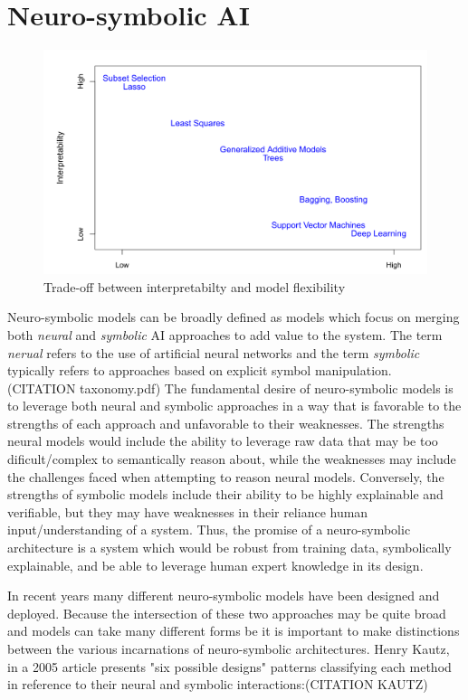 \section{Neuro-symbolic AI} \label{se:neurosymbolic_ai}

\begin{figure}[htb]
	\centering
	\includegraphics[scale=0.25]{./images/interpretability_vs_flexibility.png}
	\caption{Trade-off between interpretabilty and model flexibility \cite{james2013introduction}} 
\end{figure}

Neuro-symbolic models can be broadly defined as models which focus on merging both \textit{neural} and \textit{symbolic} AI approaches to add value to the system. The term \textit{nerual} refers to the use of artificial neural networks and the term \textit{symbolic} typically refers to approaches based on explicit symbol manipulation. (CITATION taxonomy.pdf) The fundamental desire of neuro-symbolic models is to leverage both neural and symbolic approaches in a way that is favorable to the strengths of each approach and unfavorable to their weaknesses. The strengths neural models would include the ability to leverage raw data that may be too dificult/complex to semantically reason about, while the weaknesses may include the challenges faced when attempting to reason neural models. Conversely, the strengths of symbolic models include their ability to be highly explainable and verifiable, but they may have weaknesses in their reliance human input/understanding of a system. Thus, the promise of a neuro-symbolic architecture is a system which would be robust from training data, symbolically explainable, and be able to leverage human expert knowledge in its design. 

In recent years many different neuro-symbolic models have been designed and deployed. Because the intersection of these two approaches may be quite broad and models can take many different forms be it is important to make distinctions between the various incarnations of neuro-symbolic architectures. Henry Kautz, in a 2005 article presents "six possible designs" patterns classifying each method in reference to their neural and symbolic interactions:(CITATION KAUTZ)

